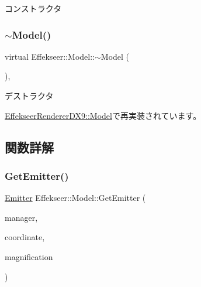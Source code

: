 コンストラクタ 

\mbox{\label{class_effekseer_1_1_model_a02266837426d39149d3eb56da7051c98}} 
\subsubsection{\texorpdfstring{$\sim$\+Model()}{~Model()}}
{\footnotesize\ttfamily virtual Effekseer\+::\+Model\+::$\sim$\+Model (\begin{DoxyParamCaption}{ }\end{DoxyParamCaption})\hspace{0.3cm}{\ttfamily [inline]}, {\ttfamily [virtual]}}



デストラクタ 



\mbox{\hyperlink{class_effekseer_renderer_d_x9_1_1_model_a5878dbe0a5971ffb28d6c1af347c6e87}{Effekseer\+Renderer\+D\+X9\+::\+Model}}で再実装されています。



\subsection{関数詳解}
\mbox{\label{class_effekseer_1_1_model_a2ac80c4050024433da6045a1085bb998}} 
\subsubsection{\texorpdfstring{Get\+Emitter()}{GetEmitter()}}
{\footnotesize\ttfamily \mbox{\hyperlink{struct_effekseer_1_1_model_1_1_emitter}{Emitter}} Effekseer\+::\+Model\+::\+Get\+Emitter (\begin{DoxyParamCaption}\item[{\mbox{\hyperlink{class_effekseer_1_1_manager}{Manager}} $\ast$}]{manager,  }\item[{\mbox{\hyperlink{namespace_effekseer_ac8508f8823c5fcf36aac5d2ddee23765}{Coordinate\+System}}}]{coordinate,  }\item[{float}]{magnification }\end{DoxyParamCaption})\hspace{0.3cm}{\ttfamily [inline]}}

